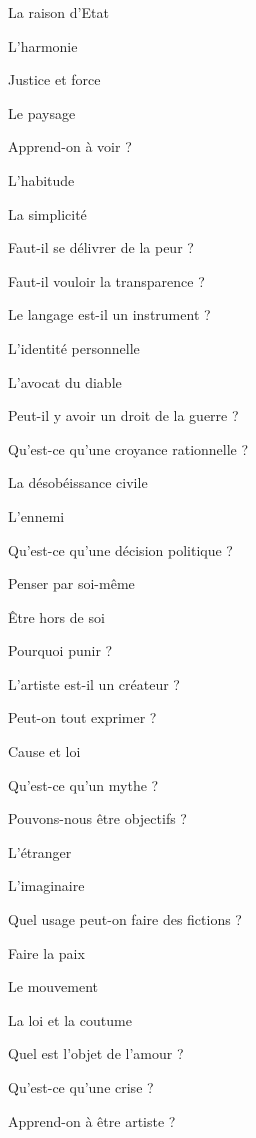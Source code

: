 \documentclass[a4paper,12pt]{report}
\begin{document}
\begin{multicols}{2}
\noindent La raison d'Etat \par
\noindent L'harmonie \par
\noindent Justice et force \par
\noindent Le paysage \par
\noindent Apprend-on à voir ? \par
\noindent L'habitude \par
\noindent La simplicité \par
\noindent Faut-il se délivrer de la peur ? \par
\noindent Faut-il vouloir la transparence ? \par
\noindent Le langage est-il un instrument ? \par
\noindent L'identité personnelle \par
\noindent L'avocat du diable \par
\noindent Peut-il y avoir un droit de la guerre ? \par
\noindent Qu'est-ce qu'une croyance rationnelle ? \par
\noindent La désobéissance civile \par
\noindent L'ennemi \par
\noindent Qu'est-ce qu'une décision politique ? \par
\noindent Penser par soi-même \par
\noindent Être hors de soi \par
\noindent Pourquoi punir ? \par
\noindent L'artiste est-il un créateur ? \par
\noindent Peut-on tout exprimer ? \par
\noindent Cause et loi \par
\noindent Qu'est-ce qu'un mythe ? \par
\noindent Pouvons-nous être objectifs ? \par
\noindent L'étranger \par
\noindent L'imaginaire \par
\noindent Quel usage peut-on faire des fictions ? \par
\noindent Faire la paix \par
\noindent Le mouvement \par
\noindent La loi et la coutume \par
\noindent Quel est l'objet de l'amour ? \par
\noindent Qu'est-ce qu'une crise ? \par
\noindent Apprend-on à être artiste ? \par

\end{multicols}
\end{document}
